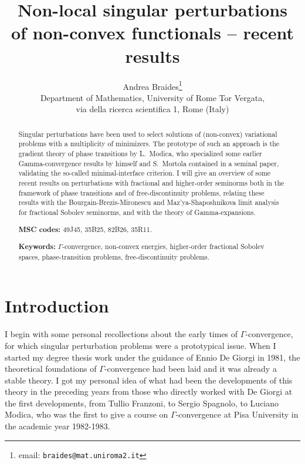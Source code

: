 \documentclass{article}
\title{Non-local singular perturbations \\ of non-convex functionals -- recent results}
\author{Andrea Braides\footnote{email: {\tt braides@mat.uniroma2.it}}\\ 
{\small Department of Mathematics, University of Rome Tor Vergata,}\\ {\small via della ricerca scientifica 1, Rome (Italy)}}
\date{}
\begin{document}
 

\maketitle
\begin{abstract} 
Singular perturbations have been used to select solutions of (non-convex) variational problems with a multiplicity of minimizers. The prototype of such an approach is the gradient theory of phase transitions by L.~Modica, who specialized some earlier Gamma-convergence results by himself and S.~Mortola contained in a seminal paper, validating the so-called minimal-interface criterion. I will give an overview of some recent results on perturbations with fractional and higher-order seminorms both in the framework of phase transitions and of free-discontinuity problems, relating these results with the Bourgain-Brezis-Mironescu and Maz'ya-Shaposhnikova limit analysis for fractional Sobolev seminorms, and with the theory of Gamma-expansions.
\smallskip

{\bf MSC codes:} 49J45, 35B25, 82B26, 35R11.

{\bf Keywords:} $\Gamma$-convergence, non-convex energies, higher-order fractional Sobolev spaces, phase-transition problems, free-discontinuity problems.

\end{abstract}




\section{Introduction}
I begin with some personal recollections about the early times of $\Gamma$-convergence, for which singular perturbation problems were a prototypical issue. When I started my degree thesis work under the guidance of Ennio De Giorgi in 1981, the theoretical foundations of $\Gamma$-convergence had been laid and it was already a stable theory. I got my personal idea of what had been the developments of this theory in the preceding years from those who directly worked with De Giorgi at the first developments, from Tullio Franzoni, to Sergio Spagnolo, to Luciano Modica, who was the first to give a course on $\Gamma$-convergence at Pisa University in the academic year 1982-1983. 
\end{document}
